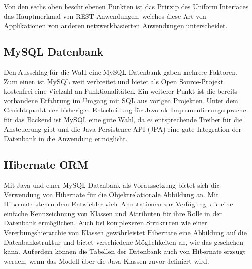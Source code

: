 Von den sechs oben beschriebenen Punkten ist das Prinzip des Uniform Interfaces das Hauptmerkmal von REST-Anwendungen, welches diese Art von Applikationen von anderen netzwerkbasierten Anwendungen unterscheidet. %


\subsection{MySQL Datenbank}
Den Ausschlag für die Wahl eine MySQL-Datenbank gaben mehrere Faktoren. Zum einen ist MySQL weit verbreitet und bietet als Open Source-Projekt kostenfrei eine Vielzahl an Funktionalitäten.
Ein weiterer Punkt ist die bereits vorhandene Erfahrung im Umgang mit SQL aus vorigen Projekten.
Unter dem Gesichtspunkt der bisherigen Entscheidung für Java als Implementierungssprache für das Backend ist MySQL eine gute Wahl, da es entsprechende Treiber für die Ansteuerung gibt und die Java Persistence API (\acs{JPA}) eine gute Integration der Datenbank in die Anwendung ermöglicht.

\subsection{Hibernate ORM}
Mit Java und einer MySQL-Datenbank als Voraussetzung bietet sich die Verwendung von Hibernate für die Objektrelationale Abbildung an.
Mit Hibernate stehen dem Entwickler viele Annotationen zur Verfügung, die eine einfache Kennzeichnung von Klassen und Attributen für ihre Rolle in der Datenbank ermöglichen.
Auch bei komplexeren Strukturen wie einer Vererbungshierarchie von Klassen gewährleistet Hibernate eine Abbildung auf die Datenbankstruktur und bietet verschiedene Möglichkeiten an, wie das geschehen kann.
Außerdem können die Tabellen der Datenbank auch von Hibernate erzeugt werden, wenn das Modell über die Java-Klassen zuvor definiert wird.
